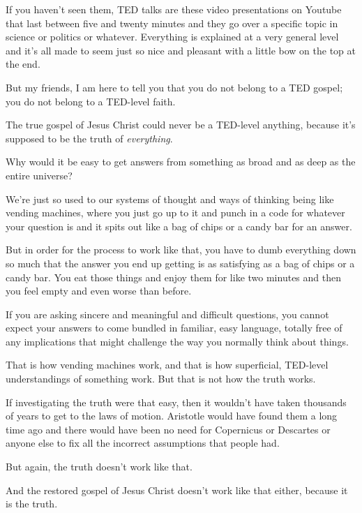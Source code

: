 \begin{compactitem}
\begin{compactitem}
					\item If you haven't seen them, TED talks are these video presentations on Youtube that last between five and twenty minutes and they go over a specific topic in science or politics or whatever. Everything is explained at a very general level and it's all made to seem just so nice and pleasant with a little bow on the top at the end.
					\item But my friends, I am here to tell you that you do not belong to a TED gospel; you do not belong to a TED-level faith.
					\item The true gospel of Jesus Christ could never be a TED-level anything, because it's supposed to be the truth of \textit{everything}.
					\item Why would it be easy to get answers from something as broad and as deep as the entire universe?
					\item We're just so used to our systems of thought and ways of thinking being like vending machines, where you just go up to it and punch in a code for whatever your question is and it spits out like a bag of chips or a candy bar for an answer.
					\item But in order for the process to work like that, you have to dumb everything down so much that the answer you end up getting is as satisfying as a bag of chips or a candy bar. You eat those things and enjoy them for like two minutes and then you feel empty and even worse than before.
					\item If you are asking sincere and meaningful and difficult questions, you cannot expect your answers to come bundled in familiar, easy language, totally free of any implications that might challenge the way you normally think about things.
					\item That is how vending machines work, and that is how superficial, TED-level understandings of something work. But that is not how the truth works.
					\item If investigating the truth were that easy, then it wouldn't have taken thousands of years to get to the laws of motion. Aristotle would have found them a long time ago and there would have been no need for Copernicus or Descartes or anyone else to fix all the incorrect assumptions that people had.
					\item But again, the truth doesn't work like that. 
					\item And the restored gospel of Jesus Christ doesn't work like that either, because it is the truth.
				\end{compactitem}
						

\end{compactitem}

